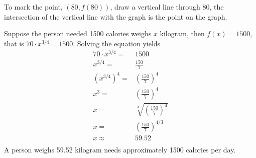 \documentclass[
  12pt]{article}
\begin{document}
\begin{enumerate}
  To mark the point, \((80, f(80))\), draw a vertical line through
  \(80\), the intersection of the vertical line with the graph is the
  point on the graph.

  Suppose the person needed 1500 calories weighs \(x\) kilogram, then
  \(f(x)=1500\), that is \(70\cdot x^{3/4}=1500\). Solving the equation
  yields \[
  \begin{aligned}
  70\cdot x^{3/4}=&1500\\
  x^{3/4}=&\frac{150}{7}\\
  (x^{3/4})^4=&(\frac{150}{7})^4\\
  x^3=&(\frac{150}{7})^4\\
  x=&\sqrt[3]{(\frac{150}{7})^4}\\
  x=&(\frac{150}{7})^{4/3}\\
  x\approx & 59.52\\
  \end{aligned}
  \] A person weighs 59.52 kilogram needs approximately 1500 calories
  per day.
\end{enumerate}
\end{document}
